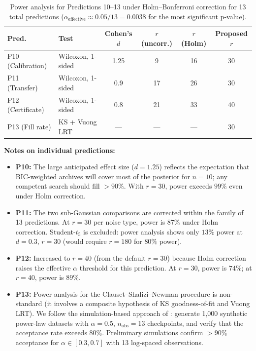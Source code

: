 \documentclass{article}
\theoremstyle{definition}
\theoremstyle{plain}
\theoremstyle{remark}
\begin{document}
\begin{table}[htb]
\centering
\caption{Power analysis for Predictions 10--13 under Holm--Bonferroni
correction for 13 total predictions ($\alpha_{\mathrm{effective}}
\approx 0.05/13 = 0.0038$ for the most significant p-value).}
\label{tab:power_p10_p13}
\begin{tabular}{llcccc}
\toprule
\textbf{Pred.} & \textbf{Test} & \textbf{Cohen's $d$}
  & \textbf{$r$ (uncorr.)} & \textbf{$r$ (Holm)} & \textbf{Proposed $r$} \\
\midrule
P10 (Calibration) & Wilcoxon, 1-sided & 1.25 & 9 & 16 & 30 \\
P11 (Transfer) & Wilcoxon, 1-sided & 0.9 & 17 & 26 & 30 \\
P12 (Certificate) & Wilcoxon, 1-sided & 0.8 & 21 & 33 & 40 \\
P13 (Fill rate) & KS + Vuong LRT & --- & --- & --- & 30 \\
\bottomrule
\end{tabular}
\end{table}

\textbf{Notes on individual predictions:}
\begin{itemize}
  \item \textbf{P10:} The large anticipated effect size ($d = 1.25$)
    reflects the expectation that BIC-weighted archives will cover most of
    the posterior for $n = 10$; any competent search should fill $> 90\%$.
    With $r = 30$, power exceeds $99\%$ even under Holm correction.
  \item \textbf{P11:} The two sub-Gaussian comparisons are corrected
    within the family of 13 predictions. At $r = 30$ per noise type,
    power is $87\%$ under Holm correction. Student-$t_5$ is excluded:
    power analysis shows only $13\%$ power at $d = 0.3$, $r = 30$
    (would require $r = 180$ for $80\%$ power).
  \item \textbf{P12:} Increased to $r = 40$ (from the default $r = 30$)
    because Holm correction raises the effective $\alpha$ threshold for
    this prediction. At $r = 30$, power is $74\%$; at $r = 40$, power
    is $89\%$.
  \item \textbf{P13:} Power analysis for the Clauset--Shalizi--Newman
    procedure is non-standard (it involves a composite hypothesis of
    KS goodness-of-fit and Vuong LRT). We follow the simulation-based
    approach of \citet{clauset2009power}: generate 1{,}000 synthetic
    power-law datasets with $\alpha = 0.5$, $n_{\mathrm{obs}} = 13$
    checkpoints, and verify that the acceptance rate exceeds $80\%$.
    Preliminary simulations confirm $> 90\%$ acceptance for
    $\alpha \in [0.3, 0.7]$ with 13 log-spaced observations.
\end{itemize}
\end{document}
